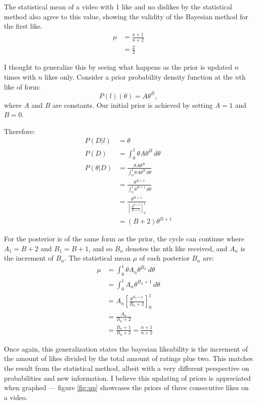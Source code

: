 \documentclass[a4paper,11pt]{article}
\begin{document}
The statistical mean of a video with 1 like and no dislikes by the statistical method also agree to this value, showing the validity of the Bayesian method for the first like.
\begin{align*}
    \mu &= \frac{x+1}{n+2}\\
        &= \frac{2}{3}
\end{align*}

I thought to generalize this by seeing what happens as the prior is updated $n$ times with $n$ likes only. Consider a prior probability density function at the $n$th like of form:
\[
    P(l)(\theta) = A \theta^B,
\]
where $A$ and $B$ are constants. Our initial prior is achieved by setting $A=1$ and $B=0$.

Therefore:
\begin{align*}
    P(D|l) &= \theta\\
    P(D) &= \int_0^1 \theta A\theta^B \, d\theta\\
    P(\theta|D) &= \frac{\theta A\theta^B}{\int_0^1 \theta A\theta^B \, d\theta}\\
    &= \frac{\theta^{B+1}}{\int_0^1 \theta^{B+1} \, d\theta}\\
    &= \frac{\theta^{B+1}}{[\frac{\theta^{B+2}}{B+2}]^1_0}\\
    &= (B+2) \theta^{B+1}
\end{align*}

For the posterior is of the same form as the prior, the cycle can continue where $A_1 = B+2$ and $B_1 = B+1$, and so $B_n$ denotes the nth like received, and $A_n$ is the increment of $B_n$. The statistical mean $\mu$ of each posterior $B_n$ are:
\begin{align*}
    \mu &= \int_0^1 \theta A_n \theta^{B_n} \, d\theta\\
    &= \int_0^1 A_n \theta^{B_n + 1} \, d\theta\\
    &= A_n [\frac{\theta^{B_n+2}}{B_n+2}]^1_0\\
    &= \frac{A_n}{B_n+2}\\
    &= \frac{B_n+1}{B_n+2} = \frac{n+1}{n+2}
\end{align*}

Once again, this generalization states the bayesian likeability is the increment of the amount of likes divided by the total amount of ratings plus two. This matches the result from the statistical method, albeit with a very different perspective on probabilities and new information. I believe this updating of priors is appreciated when graphed --- figure \ref{fig:up} showcases the priors of three consecutive likes on a video.
\end{document}
